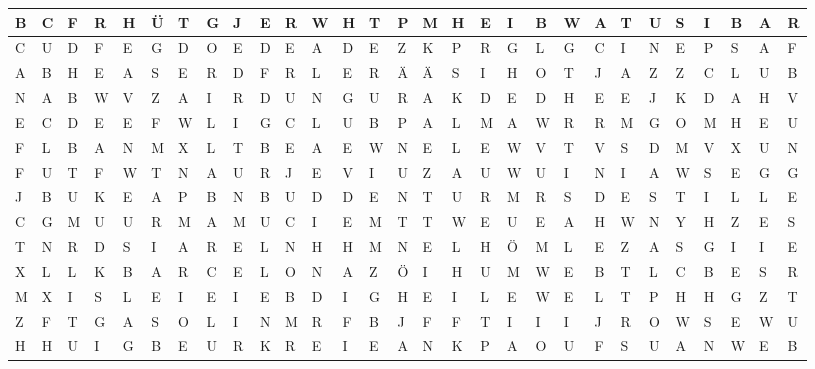 \begin{center}
	\footnotesize
	\setlength{\tabcolsep}{0.3em}
	\begin{tabular}{| *{29}{>{\centering\arraybackslash}m{1.1em} |}}
		\hline
		B & C & F & R & H & Ü & T & G & J & E & R & W & H & T & P & M & H & E
			& I & B & W & A & T & U & S & I & B & A & R
		\\ \hline
		C & U & D & F & E & G & D & O & E & D & E & A & D & E & Z & K & P & R
			& G & L & G & C & I & N & E & P & S & A & F
		\\ \hline
		A & B & H & E & A & S & E & R & D & F & R & L & E & R & Ä & Ä & S & I
			& H & O & T & J & A & Z & Z & C & L & U & B
		\\ \hline
		N & A & B & W & V & Z & A & I & R & D & U & N & G & U & R & A & K & D
			& E & D & H & E & E & J & K & D & A & H & V
		\\ \hline
		E & C & D & E & E & F & W & L & I & G & C & L & U & B & P & A & L & M
			& A & W & R & R & M & G & O & M & H & E & U
		\\ \hline
		F & L & B & A & N & M & X & L & T & B & E & A & E & W & N & E & L & E
			& W & V & T & V & S & D & M & V & X & U & N
		\\ \hline
		F & U & T & F & W & T & N & A & U & R & J & E & V & I & U & Z & A & U
			& W & U & I & N & I & A & W & S & E & G & G
		\\ \hline
		J & B & U & K & E & A & P & B & N & B & U & D & D & E & N & T & U & R
			& M & R & S & D & E & S & T & I & L & L & E
		\\ \hline
		C & G & M & U & U & R & M & A & M & U & C & I & E & M & T & T & W & E
			& U & E & A & H & W & N & Y & H & Z & E & S
		\\ \hline
		T & N & R & D & S & I & A & R & E & L & N & H & H & M & N & E & L & H
			& Ö & M & L & E & Z & A & S & G & I & I & E
		\\ \hline
		X & L & L & K & B & A & R & C & E & L & O & N & A & Z & Ö & I & H & U
			& M & W & E & B & T & L & C & B & E & S & R
		\\ \hline
		M & X & I & S & L & E & I & E & I & E & B & D & I & G & H & E & I & L
			& E & W & E & L & T & P & H & H & G & Z & T
		\\ \hline
		Z & F & T & G & A & S & O & L & I & N & M & R & F & B & J & F & F & T
			& I & I & I & J & R & O & W & S & E & W & U
		\\ \hline
		H & H & U & I & G & B & E & U & R & K & R & E & I & E & A & N & K & P
			& A & O & U & F & S & U & A & N & W & E & B

\end{tabular}
\end{center}
